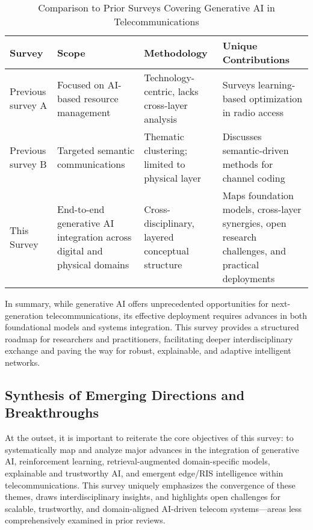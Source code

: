 \documentclass[sigconf]{acmart}
\begin{document}
\begin{table*}[htbp]
\centering
\caption{Comparison to Prior Surveys Covering Generative AI in Telecommunications}
\label{tab:survey_comparison}
\begin{adjustbox}{max width=\textwidth}
\begin{tabular}{@{}llll@{}}
\toprule
Survey & Scope & Methodology & Unique Contributions \\
\midrule
Previous survey A & Focused on AI-based resource management & Technology-centric, lacks cross-layer analysis & Surveys learning-based optimization in radio access \\
Previous survey B & Targeted semantic communications & Thematic clustering; limited to physical layer & Discusses semantic-driven methods for channel coding \\
This Survey & End-to-end generative AI integration across digital and physical domains & Cross-disciplinary, layered conceptual structure & Maps foundation models, cross-layer synergies, open research challenges, and practical deployments \\
\bottomrule
\end{tabular}
\end{adjustbox}
\end{table*}

In summary, while generative AI offers unprecedented opportunities for next-generation telecommunications, its effective deployment requires advances in both foundational models and systems integration. This survey provides a structured roadmap for researchers and practitioners, facilitating deeper interdisciplinary exchange and paving the way for robust, explainable, and adaptive intelligent networks.

\subsection{Synthesis of Emerging Directions and Breakthroughs}

At the outset, it is important to reiterate the core objectives of this survey: to systematically map and analyze major advances in the integration of generative AI, reinforcement learning, retrieval-augmented domain-specific models, explainable and trustworthy AI, and emergent edge/RIS intelligence within telecommunications. This survey uniquely emphasizes the convergence of these themes, draws interdisciplinary insights, and highlights open challenges for scalable, trustworthy, and domain-aligned AI-driven telecom systems—areas less comprehensively examined in prior reviews.
\end{document}
